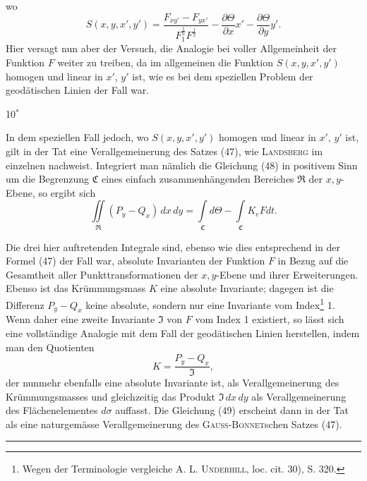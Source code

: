 wo
\[
S(x,y,x',y')=\frac{F_{xy'}-F_{yx'}}{F_1^{\frac12}F^{\frac12}}-\frac{\partial\Theta}{\partial x}x'-\frac{\partial\Theta}{\partial y}y'.
\]
Hier versagt nun aber der Versuch, die Analogie bei voller Allgemeinheit der
Funktion $F$ weiter zu treiben, da im allgemeinen die Funktion $S(x,y,x',y')$
 homogen und linear in $x'$, $y'$ ist, wie es bei dem speziellen Problem
der geodätischen Linien der Fall war.
\par\noindent\hfill 10$^{\ast}$\hspace*{5em}\par
\clearpage{}
\noindent\hspace*{\parindent}In dem speziellen Fall jedoch, wo $S(x,y,x',y')$ homogen und linear in
$x'$, $y'$ ist, gilt in der Tat eine Verallgemeinerung des Satzes (47), wie \textsc{Landsberg} im einzelnen nachweist. Integriert man nämlich die Gleichung (48) in
positivem Sinn um die Begrenzung $\mathfrak C$ eines einfach zusammenhängenden Bereiches $\mathfrak R$ der $x,y$-Ebene, so ergibt sich
\begin{equation*}\tag{49}
\iint\limits_{\mathfrak R}(P_y-Q_x)\,dx\,dy=\int\limits_{\mathfrak C}d\Theta-\int\limits_{\mathfrak C}K_eFdt.
\end{equation*}
\par\noindent\hspace*{\parindent}Die drei hier auftretenden Integrale sind, ebenso wie dies entsprechend
in der Formel (47) der Fall war, absolute Invarianten der Funktion $F$ in
Bezug auf die Gesamtheit aller Punkttransformationen der $x,y$-Ebene und
ihrer Erweiterungen. Ebenso ist das Krümmungsmass $K$ eine absolute Invariante; dagegen ist die Differenz $P_y-Q_x$ keine absolute, sondern nur eine
Invariante vom Index\footnote{Wegen der Terminologie vergleiche A. L. \textsc{Underhill}, loc. cit. 30), S. 320.} 1. Wenn daher eine zweite Invariante $\mathfrak I$ von $F$
vom Index 1 existiert, so lässt sich eine vollständige Analogie mit dem Fall
der geodätischen Linien herstellen, indem man den Quotienten
\begin{equation*}\tag{50}
K=\frac{P_y-Q_x}{\mathfrak I},
\end{equation*}
der nunmehr ebenfalls eine absolute Invariante ist, als Verallgemeinerung des
Krümmungsmasses und gleichzeitig das Produkt $\mathfrak I\,dx\,dy$ als Verallgemeinerung
des Flächenelementes $d\sigma$ auffasst. Die Gleichung (49) erscheint dann in der
Tat als eine naturgemässe Verallgemeinerung des \textsc{Gauss-Bonnet}schen Satzes (47).
\par\begin{center}\rule{.18\linewidth}{.3pt}\end{center}
\clearpage\endgroup
